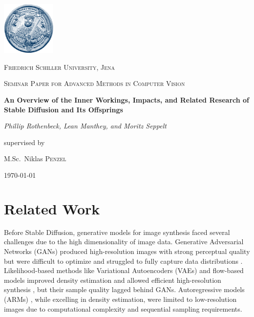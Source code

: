 \documentclass[11pt]{article}
\begin{document}
\begin{titlepage}
    \centering
    \includegraphics[width=0.2\textwidth]{assets/uni-logo.png}\par\vspace{0.5cm}
    {\scshape\LARGE Friedrich Schiller University, Jena \par}
    \vspace{1cm}
    {\scshape\Large Seminar Paper for Advanced Methods in Computer Vision\par}
    \vspace{1.5cm}
    {\huge\bfseries An Overview of the Inner Workings, Impacts, and Related Research of Stable Diffusion and Its Offsprings\par}
    \vspace{2cm}
    {\Large\itshape Phillip Rothenbeck, Lean Manthey, and Moritz Seppelt\par}
    \vfill
    supervised by\par
    M.Sc.~Niklas \textsc{Penzel}

    \vfill

    {\large \today\par}
\end{titlepage}

\tableofcontents
\newpage



\section{Related Work}
Before Stable Diffusion, generative models for image synthesis faced several challenges due to the high dimensionality of image data. Generative Adversarial Networks (GANs) \cite{goodfellow2014GAN} produced high-resolution images with strong perceptual quality \cite{bigganbrock, DBLP:journals/corr/abs-1912-04958} but were difficult to optimize and struggled to fully capture data distributions \cite{arjovsky2017wasserstein, gulrajani2017improved, DBLP:journals/corr/abs-1801-04406}. Likelihood-based methods like Variational Autoencoders (VAEs) \cite{VAE} and flow-based models \cite{dinh2015nice, DBLP:conf/iclr/DinhSB17} improved density estimation and allowed efficient high-resolution synthesis \cite{DBLP:journals/corr/abs-2011-10650, glow, DBLP:conf/nips/VahdatK20}, but their sample quality lagged behind GANs. Autoregressive models (ARMs) \cite{DBLP:conf/icml/ChenRC0JLS20, DBLP:journals/corr/abs-1904-10509, NIPS2016_b1301141, DBLP:journals/corr/OordKK16}, while excelling in density estimation, were limited to low-resolution images due to computational complexity and sequential sampling requirements.
\end{document}
